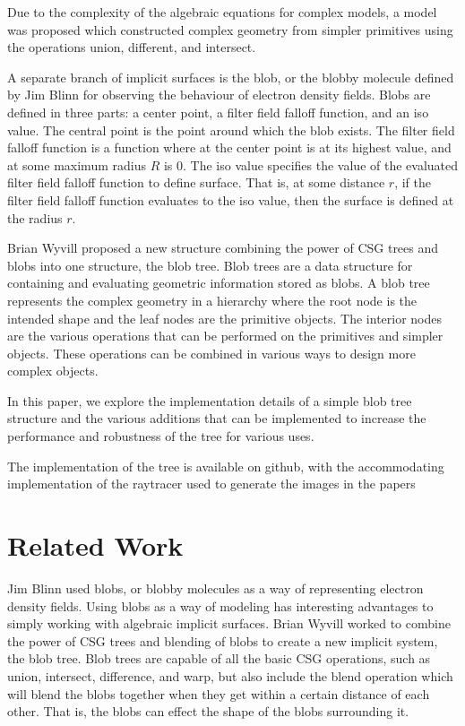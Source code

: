 \documentclass[conference]{acmsiggraph}
\begin{document}
Due to the complexity of the algebraic equations for complex models, a model
was proposed which constructed complex geometry from simpler primitives using
the operations union, different, and intersect.

A separate branch of implicit surfaces is the blob, or the blobby molecule
defined by Jim Blinn  for observing the behaviour of electron
density fields. Blobs are defined in three parts: a center point, a filter
field falloff function, and an iso value. The central point is the point around
which the blob exists. The filter field falloff function is a function where at
the center point is at its highest value, and at some maximum radius $R$ is 0.
The iso value specifies the value of the evaluated filter field falloff
function to define surface. That is, at some distance $r$, if the filter field
falloff function evaluates to the iso value, then the surface is defined at the
radius $r$.

Brian Wyvill proposed a new structure combining the power of CSG trees and
blobs into one structure, the blob tree. Blob trees are a data structure for
containing and evaluating geometric information stored as blobs. A blob tree
represents the complex geometry in a hierarchy where the root node is the
intended shape and the leaf nodes are the primitive objects. The interior nodes
are the various operations that can be performed on the primitives and simpler
objects. These operations can be combined in various ways to design more
complex objects.

In this paper, we explore the implementation details of a simple blob tree
structure and the various additions that can be implemented to increase the
performance and robustness of the tree for various uses.

The implementation of the tree is available on github, with the accommodating implementation of the raytracer used to
generate the images in the papers


\section{Related Work}
Jim Blinn used blobs, or blobby molecules as a way of representing electron
density fields\cite{Blinn}. Using blobs as a way of modeling has interesting
advantages to simply working with algebraic implicit surfaces. Brian Wyvill
worked to combine the power of CSG trees and blending of blobs to create a new
implicit system, the blob tree. Blob trees are capable of all the basic CSG
operations, such as union, intersect, difference, and warp, but also include
the blend operation which will blend the blobs together when they get within a
certain distance of each other. That is, the blobs can effect the shape of the
blobs surrounding it.
\end{document}
